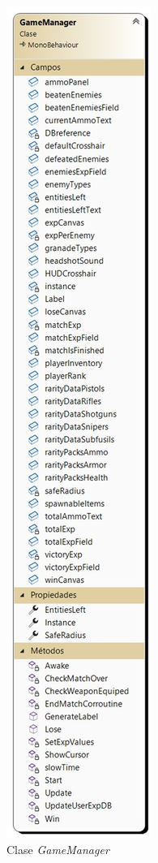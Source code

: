 \begin{figure}[h]
	\centering
	\includegraphics[scale=0.45]{img/GameManager.jpg}
	\caption{Clase \textit{GameManager}}
	\label{fig:GameManager}
    \end{figure}
